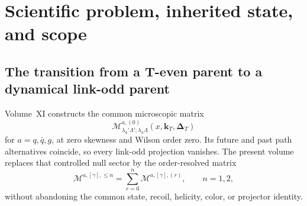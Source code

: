 \documentclass[11pt]{article}
\newcommand{\kT}{\bm{k}_{T}}
\newcommand{\DT}{\bm{\Delta}_{T}}
\newcommand{\cM}{\mathcal M}
\begin{document}
\begin{abstract}
A microscopic TMD model requires more than a complex light-front wave
function or a path label attached to a fitted distribution.  The link-odd
part of a quark, antiquark, or gluon correlator must arise from a declared
Wilson operator, the same gauge interactions that appear in the Hamiltonian,
physical spectral support for an absorptive cut, and the OAM and helicity
interferences selected by the operator projector.  We formulate the complete
order-one and order-two Wilson layer for the DeuteronWigner microscopic
nucleon.  The input is the common H4/H7 nonzero-transfer helicity-matrix
parent.  Future- and past-pointing paths generate their pole prescriptions
from the path and Fourier conventions.  Continuum and finite-volume spectral
rules determine the discontinuity; numerical broadening never constitutes
physical support.  At first order, complete quark and antiquark link-odd
matrices generate distinct Sivers and Boer--Mulders projections, while the
gluon parent retains four ordered link pairs, independent antisymmetric
\(f^{abc}\) and symmetric \(d^{abc}\) color channels, and all transverse
polarization sectors.  At second order, explicit \(qqqgg\), \(qqqggg\), and
\(qqqq\bar q gg\) support permits strict Dyson--Magnus comparisons for all
partonic species.  Ordered single cuts, the real double-cut intersection,
contact and instantaneous terms, and the square-root-soft expansion are
tracked by typed ledgers and count-once two-cells.  We provide the operator
identities, support theorems, convergence obligations, software interfaces,
benchmark suite, negative tests, and the exact contract with the spin-1
nuclear and QCD-matching layers.  The resulting objects remain regulated
finite-basis boundaries, not physical soft-subtracted TMDs.
\end{abstract}

\tableofcontents

\section{Scientific problem, inherited state, and scope}
\label{sec:scope}

\subsection{The transition from a T-even parent to a dynamical link-odd parent}

Volume~XI constructs the common microscopic matrix
\begin{equation}
 \cM^{a,(0)}_{\lambda_a'\Lambda';\lambda_a\Lambda}
 (x,\kT,\DT)
 \label{eq:t-even-parent}
\end{equation}
for \(a=q,\bar q,g\), at zero skewness and Wilson order zero.  Its future and
past path alternatives coincide, so every link-odd projection vanishes.  The
present volume replaces that controlled null sector by the order-resolved
matrix
\begin{equation}
 \cM^{a,[\gamma],\leq n}
 =
 \sum_{r=0}^{n}
 \cM^{a,[\gamma],(r)},
 \qquad n=1,2,
 \label{eq:order-resolved-parent}
\end{equation}
without abandoning the common state, recoil, helicity, color, or projector
identity.
\end{document}
